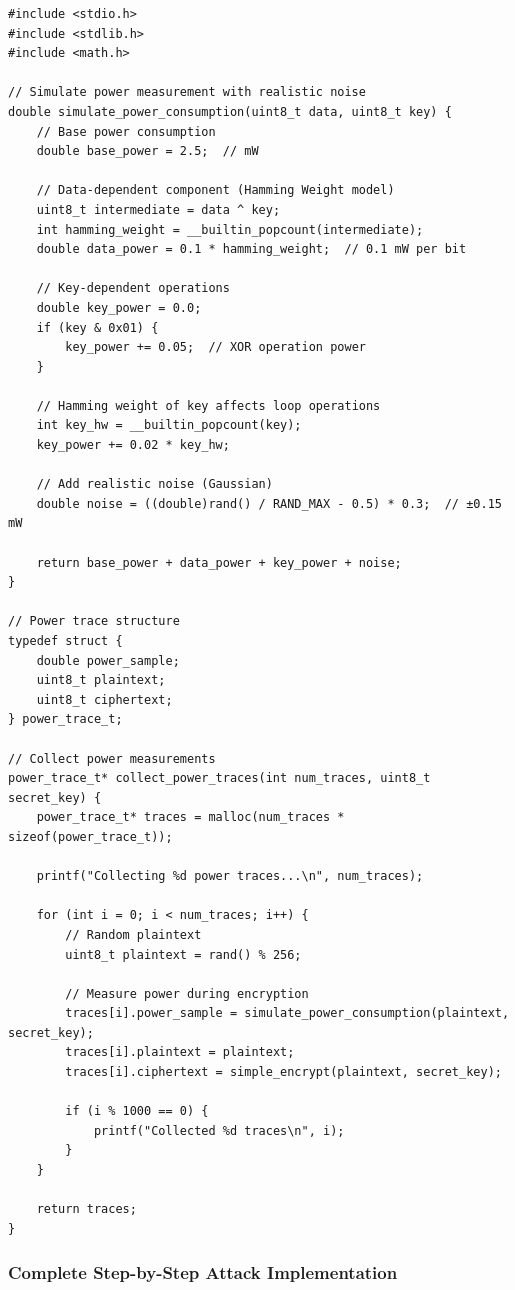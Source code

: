 \documentclass[11pt,a4paper]{article}
\theoremstyle{definition}
\begin{document}
\begin{lstlisting}[caption={Power Measurement Infrastructure}]
#include <stdio.h>
#include <stdlib.h>
#include <math.h>

// Simulate power measurement with realistic noise
double simulate_power_consumption(uint8_t data, uint8_t key) {
    // Base power consumption
    double base_power = 2.5;  // mW
    
    // Data-dependent component (Hamming Weight model)
    uint8_t intermediate = data ^ key;
    int hamming_weight = __builtin_popcount(intermediate);
    double data_power = 0.1 * hamming_weight;  // 0.1 mW per bit
    
    // Key-dependent operations
    double key_power = 0.0;
    if (key & 0x01) {
        key_power += 0.05;  // XOR operation power
    }
    
    // Hamming weight of key affects loop operations
    int key_hw = __builtin_popcount(key);
    key_power += 0.02 * key_hw;
    
    // Add realistic noise (Gaussian)
    double noise = ((double)rand() / RAND_MAX - 0.5) * 0.3;  // ±0.15 mW
    
    return base_power + data_power + key_power + noise;
}

// Power trace structure
typedef struct {
    double power_sample;
    uint8_t plaintext;
    uint8_t ciphertext;
} power_trace_t;

// Collect power measurements
power_trace_t* collect_power_traces(int num_traces, uint8_t secret_key) {
    power_trace_t* traces = malloc(num_traces * sizeof(power_trace_t));
    
    printf("Collecting %d power traces...\n", num_traces);
    
    for (int i = 0; i < num_traces; i++) {
        // Random plaintext
        uint8_t plaintext = rand() % 256;
        
        // Measure power during encryption
        traces[i].power_sample = simulate_power_consumption(plaintext, secret_key);
        traces[i].plaintext = plaintext;
        traces[i].ciphertext = simple_encrypt(plaintext, secret_key);
        
        if (i % 1000 == 0) {
            printf("Collected %d traces\n", i);
        }
    }
    
    return traces;
}
\end{lstlisting}

\subsubsection{Complete Step-by-Step Attack Implementation}
\end{document}

